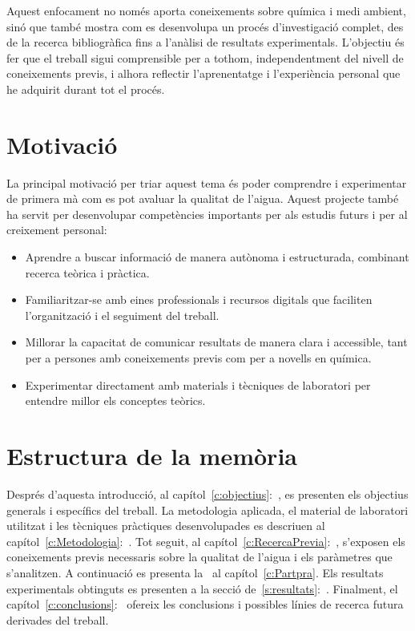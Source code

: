 Aquest enfocament no només aporta coneixements sobre química i medi ambient, sinó que també mostra com es desenvolupa un procés d’investigació complet, des de la recerca bibliogràfica fins a l’anàlisi de resultats experimentals. L’objectiu és fer que el treball sigui comprensible per a tothom, independentment del nivell de coneixements previs, i alhora reflectir l’aprenentatge i l’experiència personal que he adquirit durant tot el procés.

\section{Motivació}

La principal motivació per triar aquest tema és poder comprendre i experimentar de primera mà com es pot avaluar la qualitat de l’aigua. Aquest projecte també ha servit per desenvolupar competències importants per als estudis futurs i per al creixement personal:

\begin{itemize}
    \item Aprendre a buscar informació de manera autònoma i estructurada, combinant recerca teòrica i pràctica.
    \item Familiaritzar-se amb eines professionals i recursos digitals que faciliten l’organització i el seguiment del treball.
    \item Millorar la capacitat de comunicar resultats de manera clara i accessible, tant per a persones amb coneixements previs com per a novells en química.
    \item Experimentar directament amb materials i tècniques de laboratori per entendre millor els conceptes teòrics.
\end{itemize}

\section{Estructura de la memòria}

Després d’aquesta introducció, al capítol~\ref{c:objectius}:~, es presenten els objectius generals i específics del treball. La metodologia aplicada, el material de laboratori utilitzat i les tècniques pràctiques desenvolupades es descriuen al capítol~\ref{c:Metodologia}:~. Tot seguit, al capítol~\ref{c:RecercaPrevia}:~, s’exposen els coneixements previs necessaris sobre la qualitat de l’aigua i els paràmetres que s’analitzen. A continuació es presenta la~ al capítol~\ref{c:Partpra}. Els resultats experimentals obtinguts es presenten a la secció de~\ref{s:resultats}:~. Finalment, el capítol~\ref{c:conclusions}:~ ofereix les conclusions i possibles línies de recerca futura derivades del treball.



